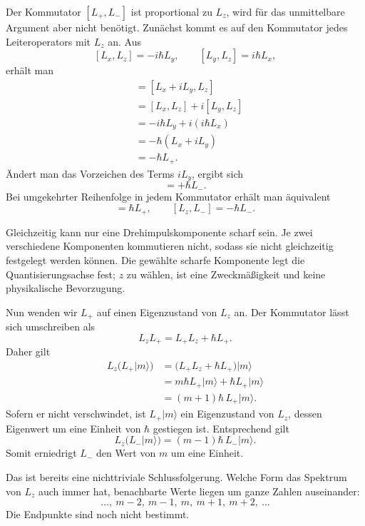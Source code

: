 Der Kommutator \([L_+,L_-]\) ist proportional zu \(L_z\), wird für das unmittelbare Argument aber nicht benötigt. Zunächst kommt es auf den Kommutator jedes Leiteroperators mit \(L_z\) an. Aus
\[
[L_x,L_z]=-i\hbar L_y,
\qquad
[L_y,L_z]=i\hbar L_x,
\]
erhält man
\begin{align}
[L_+,L_z]
&=[L_x+iL_y,L_z] \\
&=[L_x,L_z]+i[L_y,L_z] \\
&=-i\hbar L_y+i(i\hbar L_x) \\
&=-\hbar(L_x+iL_y) \\
&=-\hbar L_+.
\end{align}
Ändert man das Vorzeichen des Terms \(iL_y\), ergibt sich
\begin{equation}
[L_-,L_z]=+\hbar L_-.
\end{equation}
Bei umgekehrter Reihenfolge in jedem Kommutator erhält man äquivalent
\begin{equation}
[L_z,L_+]=\hbar L_+,
\qquad
[L_z,L_-]=-\hbar L_-.
\end{equation}

Gleichzeitig kann nur eine Drehimpulskomponente scharf sein. Je zwei verschiedene Komponenten kommutieren nicht, sodass sie nicht gleichzeitig festgelegt werden können. Die gewählte scharfe Komponente legt die Quantisierungsachse fest; \(z\) zu wählen, ist eine Zweckmäßigkeit und keine physikalische Bevorzugung.

Nun wenden wir \(L_+\) auf einen Eigenzustand von \(L_z\) an. Der Kommutator lässt sich umschreiben als
\begin{equation}
L_zL_+=L_+L_z+\hbar L_+.
\end{equation}
Daher gilt
\begin{align}
L_z\bigl(L_+\lvert m\rangle\bigr)
&=\bigl(L_+L_z+\hbar L_+\bigr)\lvert m\rangle \\
&=m\hbar L_+\lvert m\rangle+\hbar L_+\lvert m\rangle \\
&=(m+1)\hbar\,L_+\lvert m\rangle.
\end{align}
Sofern er nicht verschwindet, ist \(L_+\lvert m\rangle\) ein Eigenzustand von \(L_z\), dessen Eigenwert um eine Einheit von \(\hbar\) gestiegen ist. Entsprechend gilt
\begin{equation}
L_z\bigl(L_-\lvert m\rangle\bigr)
=(m-1)\hbar\,L_-\lvert m\rangle.
\end{equation}
Somit erniedrigt \(L_-\) den Wert von \(m\) um eine Einheit.

Das ist bereits eine nichttriviale Schlussfolgerung. Welche Form das Spektrum von \(L_z\) auch immer hat, benachbarte Werte liegen um ganze Zahlen auseinander:
\begin{equation}
\ldots,\ m-2,\ m-1,\ m,\ m+1,\ m+2,\ \ldots
\end{equation}
Die Endpunkte sind noch nicht bestimmt.

